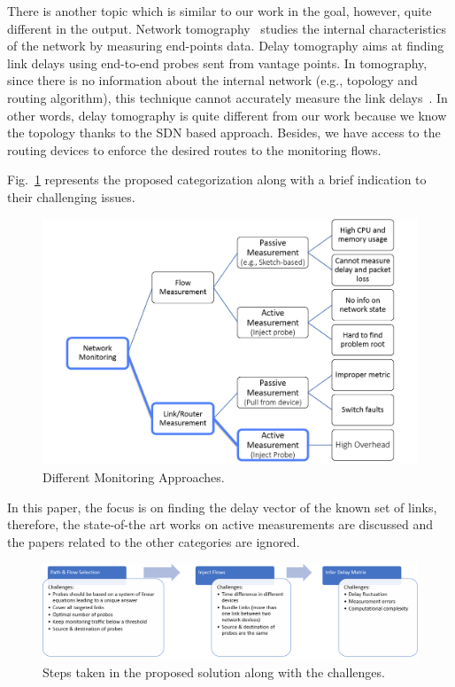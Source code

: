 \documentclass[10pt, journal, letterpaper]{IEEEtran}
\begin{document}
There is another topic which is similar to our work in the goal, however, quite different in the output. Network tomography~\cite{vardi1996network} studies the internal characteristics of the network by measuring end-points data. Delay tomography aims at finding link delays using end-to-end probes sent from vantage points. In tomography, since there is no information about the internal network (e.g., topology and routing algorithm), this technique cannot accurately measure the link delays~\cite{lawrence2006networkNew}. In other words, delay tomography is quite different from our work because we know the topology thanks to the SDN based approach. Besides, we have access to the routing devices to enforce the desired routes to the monitoring flows.


Fig.~\ref{fig:differentMonitoring} represents the proposed categorization along with a brief indication to their challenging issues.
\begin{figure}
    \centering
    \includegraphics[width=\columnwidth]{img/Different_monitoring_methods.png}
    \caption{Different Monitoring Approaches.}
    \label{fig:differentMonitoring}
\end{figure}
In this paper, the focus is on finding the delay vector of the known set of links, therefore, the state-of-the art works on active measurements are discussed and the papers related to the other categories are ignored.

\begin{figure}
    \centering
    \includegraphics[width=\linewidth]{img/Challenges.png}
    \caption{Steps taken in the proposed solution along with the challenges.}
    \label{fig:challenges}
\end{figure}
\end{document}
